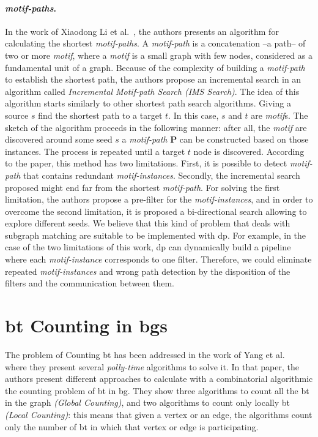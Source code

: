 \paragraph{\emph{motif-paths}.} In the work of Xiaodong Li et al.~\cite{Li2019MotifPA}, the authors presents an algorithm for calculating the shortest \emph{motif-paths}.
A \emph{motif-path} is a concatenation --a path--  of two or more \emph{motif}, where a \emph{motif} is a small graph with few nodes, considered as a fundamental unit of a graph.
Because of the complexity of building a \emph{motif-path} to establish the shortest path, the authors propose an incremental search in an algorithm called \emph{Incremental Motif-path Search (IMS Search)}.
The idea of this algorithm starts similarly to other shortest path search algorithms. Giving a source $s$ find the shortest path to a target $t$. In this case, $s$ and $t$ are \emph{motif}s.
The sketch of the algorithm proceeds in the following manner: after all, the \emph{motif} are discovered around some seed $s$ a \emph{motif-path} $\mathbf{P}$ can be constructed based on those instances.
The process is repeated until a target $t$ node is discovered. According to the paper, this method has two limitations. First, it is possible to detect \emph{motif-path} that contains 
redundant \emph{motif-instances}. Secondly, the incremental search proposed might end far from the shortest \emph{motif-path}. For solving the first limitation, the authors propose a pre-filter for the \emph{motif-instances},
and in order to overcome the second limitation, it is proposed a bi-directional search allowing to explore different seeds. 
We believe that this kind of problem that deals with subgraph matching are suitable to be implemented with \acrlong{dp}. 
For example, in the case of the two limitations of this work, \acrshort{dp} can dynamically build a pipeline where each \emph{motif-instance} corresponds to one filter. 
Therefore, we could eliminate repeated \emph{motif-instances} and wrong path detection by the disposition of the filters and the communication between them.

\section{\acrlong{bt} Counting in \acrlong{bg}s}\label{sec:rel-work:counting}
The problem of Counting \acrshort{bt} has been addressed in the work of Yang et al.~\cite{btcount} where they present several \emph{polly-time} algorithms to solve it.
In that paper, the authors present different approaches to calculate with a combinatorial algorithmic the counting problem of \acrshort{bt} in \acrshort{bg}. 
They show three algorithms to count all the \acrshort{bt} in the graph \emph{(Global Counting)}, and two algorithms to count only locally \acrshort{bt} \emph{(Local Counting)}: this means that given a vertex or an edge, the algorithms count only the number of \acrshort{bt} in which 
that vertex or edge is participating.

